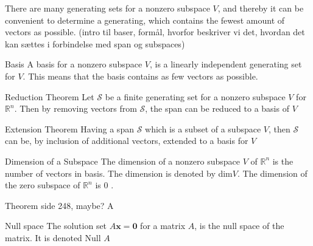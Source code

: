 There are many generating sets for a nonzero subspace $V$, and thereby it can be convenient to determine a generating, which contains the fewest amount of vectors as possible. 
(intro til baser, formål, hvorfor beskriver vi det, hvordan det kan sættes i forbindelse med span og subspaces)

\begin{definition}{Basis}
A basis for a nonzero subspace $V$, is a linearly independent generating set for $V$. This means that the basis contains as few vectors as possible.
\end{definition}

\begin{theorem}{Reduction Theorem}
Let $\mathcal{S}$ be a finite generating set for a nonzero subspace $V$ for $\mathbb{R}^n$. Then by removing vectors from $\mathcal{S}$, the span can be reduced to a basis of $V$
\label{reductiontheorem}
\end{theorem}


\begin{theorem}{Extension Theorem}
Having a span $\mathcal{S}$ which is a subset of a subspace $V$, then $\mathcal{S}$ can be, by inclusion of additional vectors, extended to a basis for $V$
\end{theorem}


\begin{definition}{Dimension of a Subspace}
The dimension of a nonzero subspace $V$ of $\mathbb{R}^n$ is the number of vectors in  basis. The dimension is denoted by dim$V$. The dimension of the zero subspace of $\mathbb{R}^n$ is 0  \cite[246]{LiAl}.
\end{definition}
\begin{theorem}{Theorem side 248, maybe?}
A
\end{theorem}
\begin{definition}{Null space}
The solution set $A\textbf{x}=\textbf{0}$ for a matrix $A$, is the null space of the matrix. It is denoted Null $A$
\end{definition}

